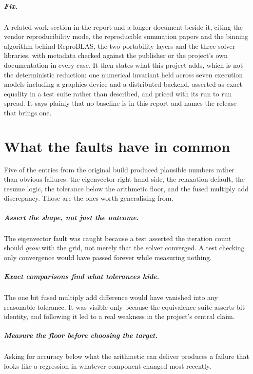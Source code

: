 \documentclass[11pt,a4paper]{report}
\newcommand{\fix}[1]{\paragraph{Fix.}#1}
\begin{document}
\fix{A related work section in the report and a longer document beside it, citing
the vendor reproducibility mode, the reproducible summation papers and the
binning algorithm behind ReproBLAS, the two portability layers and the three
solver libraries, with metadata checked against the publisher or the project's
own documentation in every case. It then states what this project adds, which is
not the deterministic reduction: one numerical invariant held across seven
execution models including a graphics device and a distributed backend, asserted
as exact equality in a test suite rather than described, and priced with its run
to run spread. It says plainly that no baseline is in this report and names the
release that brings one.}

\chapter{What the faults have in common}

Five of the entries from the original build produced plausible numbers rather
than obvious failures: the eigenvector right hand side, the relaxation default,
the resume logic, the tolerance below the arithmetic floor, and the fused
multiply add discrepancy. Those are the ones worth generalising from.

\paragraph{Assert the shape, not just the outcome.} The eigenvector fault was
caught because a test asserted the iteration count should \emph{grow} with the
grid, not merely that the solver converged. A test checking only convergence
would have passed forever while measuring nothing.

\paragraph{Exact comparisons find what tolerances hide.} The one bit fused
multiply add difference would have vanished into any reasonable tolerance. It was
visible only because the equivalence suite asserts bit identity, and following it
led to a real weakness in the project's central claim.

\paragraph{Measure the floor before choosing the target.} Asking for accuracy
below what the arithmetic can deliver produces a failure that looks like a
regression in whatever component changed most recently.
\end{document}
